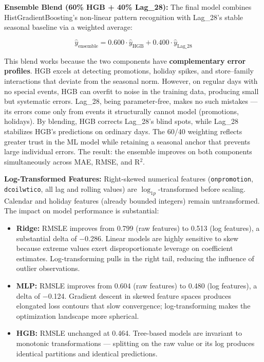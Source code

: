 \textbf{Ensemble Blend (60\% HGB + 40\% Lag\_28):} The final model combines HistGradientBoosting's non-linear pattern recognition with Lag\_28's stable seasonal baseline via a weighted average:

\[
\hat{y}_{\text{ensemble}} = 0.600 \cdot \hat{y}_{\text{HGB}} + 0.400 \cdot \hat{y}_{\text{Lag\_28}}
\]

This blend works because the two components have \textbf{complementary error profiles}. HGB excels at detecting promotions, holiday spikes, and store–family interactions that deviate from the seasonal norm. However, on regular days with no special events, HGB can overfit to noise in the training data, producing small but systematic errors. Lag\_28, being parameter-free, makes no such mistakes — its errors come only from events it structurally cannot model (promotions, holidays). By blending, HGB corrects Lag\_28's blind spots, while Lag\_28 stabilizes HGB's predictions on ordinary days. The 60/40 weighting reflects greater trust in the ML model while retaining a seasonal anchor that prevents large individual errors. The result: the ensemble improves on both components simultaneously across MAE, RMSE, and R$^2$.

\textbf{Log-Transformed Features:} Right-skewed numerical features (\texttt{onpromotion}, \texttt{dcoilwtico}, all lag and rolling values) are $\log_{1p}$-transformed before scaling. Calendar and holiday features (already bounded integers) remain untransformed. The impact on model performance is substantial:

\begin{itemize}
  \item \textbf{Ridge:} RMSLE improves from 0.799 (raw features) to 0.513 (log features), a substantial delta of $-$0.286. Linear models are highly sensitive to skew because extreme values exert disproportionate leverage on coefficient estimates. Log-transforming pulls in the right tail, reducing the influence of outlier observations.
  \item \textbf{MLP:} RMSLE improves from 0.604 (raw features) to 0.480 (log features), a delta of $-$0.124. Gradient descent in skewed feature spaces produces elongated loss contours that slow convergence; log-transforming makes the optimization landscape more spherical.
  \item \textbf{HGB:} RMSLE unchanged at 0.464. Tree-based models are invariant to monotonic transformations — splitting on the raw value or its log produces identical partitions and identical predictions.
\end{itemize}

